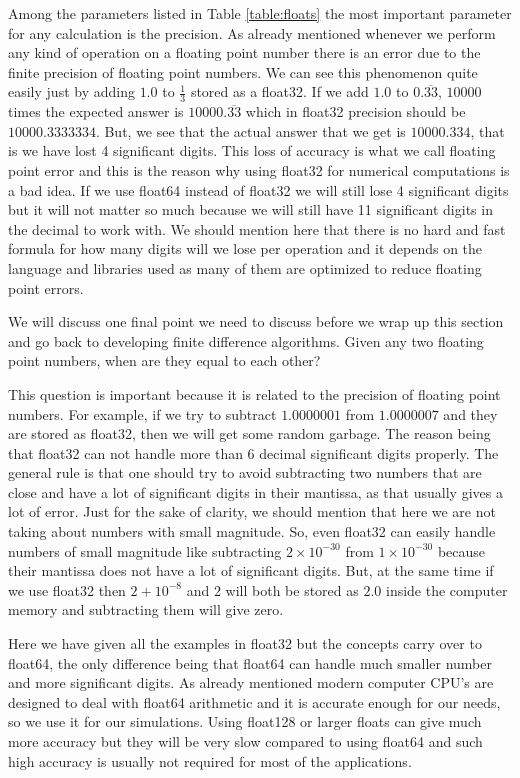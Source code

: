 Among the parameters listed in Table \ref{table:floats} the most important parameter for any calculation is the precision. As already mentioned whenever we perform any kind of operation on a floating point number there is an error due to the finite precision of floating point numbers.
We can see this phenomenon quite easily just by adding $1.0$ to $\frac{1}{3}$ stored as a float32. If we add $1.0$ to $0.\overline{33}$, $10000$ times the expected answer is $10000.\overline{33}$ which in float32 precision should be $10000.3333334$. But, we see that the actual answer that we get is $10000.334$, that is we have lost 4 significant digits.
This loss of accuracy is what we call floating point error and this is the reason why using float32 for numerical computations is a bad idea. If we use float64 instead of float32 we will still lose 4 significant digits but it will not matter so much because we will still have 11 significant digits in the decimal to work with. We should mention here that there is no hard and fast formula for how many digits will we lose per operation and it depends on the language and libraries used as many of them are optimized to reduce floating point errors.\label{para:addition_errors}

We will discuss one final point we need to discuss before we wrap up this section and go back to developing finite difference algorithms. Given any two floating point numbers, when are they equal to each other?

This question is important because it is related to the precision of floating point numbers. For example, if we try to subtract $1.0000001$ from $1.0000007$ and they are stored as float32, then we will get some random garbage. The reason being that float32 can not handle more than 6 decimal significant digits properly.
The general rule is that one should try to avoid subtracting two numbers that are close and have a lot of significant digits in their mantissa, as that usually gives a lot of error.
Just for the sake of clarity, we should mention that here we are not taking about numbers with small magnitude. So, even float32 can easily handle numbers of small magnitude like subtracting $2 \times 10^{-30}$ from $1 \times 10^{-30}$ because their mantissa does not have a lot of significant digits. But, at the same time if we use float32 then $2 + 10^{-8}$ and $2$ will both be stored as $2.0$ inside the computer memory and subtracting them will give zero.


Here we have given all the examples in float32 but the concepts carry over to float64, the only difference being that float64 can handle much smaller number and more significant digits. As already mentioned modern computer CPU's are designed to deal with float64 arithmetic and it is accurate enough for our needs, so we use it for our simulations. Using float128 or larger floats can give much more accuracy but they will be very slow compared to using float64 and such high accuracy is usually not required for most of the applications.

